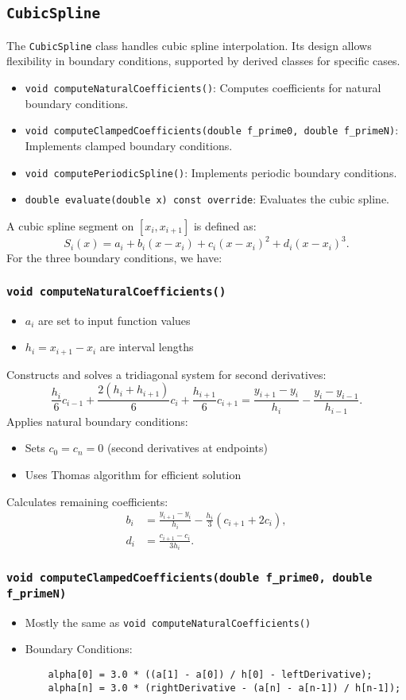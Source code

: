 \documentclass{article}
\begin{document}
\subsection{\texttt{CubicSpline}}
The \texttt{CubicSpline} class handles cubic spline interpolation. Its design allows flexibility in boundary conditions, supported by derived classes for specific cases.
\begin{itemize}
    \item \texttt{void computeNaturalCoefficients()}: Computes coefficients for natural boundary conditions.
    \item \texttt{void computeClampedCoefficients(double f\_prime0, double f\_primeN)}: Implements clamped boundary conditions.
    \item \texttt{void computePeriodicSpline()}: Implements periodic boundary conditions.
    \item \texttt{double evaluate(double x) const override}: Evaluates the cubic spline.
\end{itemize}
A cubic spline segment on $[x_i, x_{i+1}]$ is defined as:
\[
S_i(x) = a_i + b_i(x - x_i) + c_i(x - x_i)^2 + d_i(x - x_i)^3.
\]
For the three boundary conditions, we have:
\subsubsection{\texttt{void computeNaturalCoefficients()}}
\begin{itemize}
    \item $a_i$ are set to input function values
    \item $h_i = x_{i+1} - x_i$ are interval lengths
\end{itemize}
Constructs and solves a tridiagonal system for second derivatives:
\[
\frac{h_i}{6}c_{i-1} + \frac{2(h_i + h_{i+1})}{6}c_i + \frac{h_{i+1}}{6}c_{i+1} = \frac{y_{i+1} - y_i}{h_i} - \frac{y_i - y_{i-1}}{h_{i-1}}.
\]
Applies natural boundary conditions:
\begin{itemize}
    \item Sets $c_0 = c_n = 0$ (second derivatives at endpoints)
    \item Uses Thomas algorithm for efficient solution
\end{itemize}
Calculates remaining coefficients:
\begin{align*}
b_i &= \frac{y_{i+1} - y_i}{h_i} - \frac{h_i}{3}(c_{i+1} + 2c_i), \\
d_i &= \frac{c_{i+1} - c_i}{3h_i}.
\end{align*}
\subsubsection{\texttt{void computeClampedCoefficients(double f\_prime0, double f\_primeN)}}
\begin{itemize}
    \item Mostly the same as \texttt{void computeNaturalCoefficients()}
    \item Boundary Conditions:
    \begin{verbatim}
    alpha[0] = 3.0 * ((a[1] - a[0]) / h[0] - leftDerivative);
    alpha[n] = 3.0 * (rightDerivative - (a[n] - a[n-1]) / h[n-1]);
    \end{verbatim}
\end{itemize}
\end{document}
